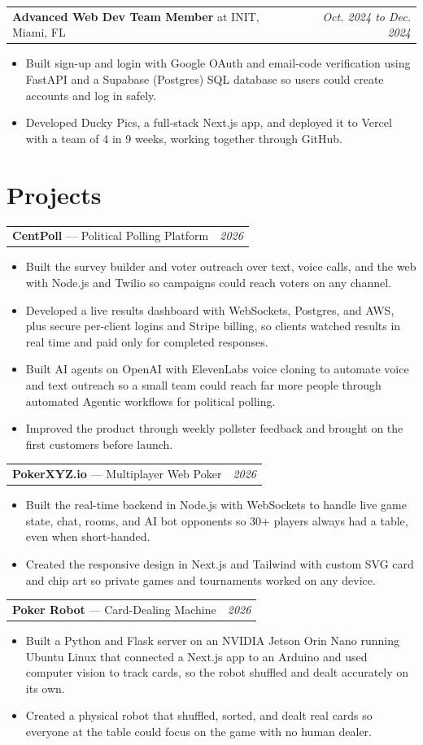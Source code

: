 \documentclass[letterpaper]{article}
\makeatletter
\newcommand{\entry}[3]{%
  \vspace{4pt}\needspace{4\baselineskip}
  \begin{tabular*}{\textwidth}{@{}l@{\extracolsep{\fill}}r@{}}
    \textbf{#1}#2 & \textit{#3} \\
  \end{tabular*}\par\vspace{1pt}}
\makeatother
\begin{document}
\entry{Advanced Web Dev Team Member}{ at INIT, Miami, FL}{Oct. 2024 to Dec. 2024}
\begin{itemize}
  \item Built sign-up and login with Google OAuth and email-code verification using FastAPI and a Supabase (Postgres) SQL database so users could create accounts and log in safely.
  \item Developed Ducky Pics, a full-stack Next.js app, and deployed it to Vercel with a team of 4 in 9 weeks, working together through GitHub.
\end{itemize}

\section{Projects}

\entry{CentPoll}{ --- Political Polling Platform}{2026}
\begin{itemize}
  \item Built the survey builder and voter outreach over text, voice calls, and the web with Node.js and Twilio so campaigns could reach voters on any channel.
  \item Developed a live results dashboard with WebSockets, Postgres, and AWS, plus secure per-client logins and Stripe billing, so clients watched results in real time and paid only for completed responses.
  \item Built AI agents on OpenAI with ElevenLabs voice cloning to automate voice and text outreach so a small team could reach far more people through automated Agentic workflows for political polling.
  \item Improved the product through weekly pollster feedback and brought on the first customers before launch.
\end{itemize}

\entry{PokerXYZ.io}{ --- Multiplayer Web Poker}{2026}
\begin{itemize}
  \item Built the real-time backend in Node.js with WebSockets to handle live game state, chat, rooms, and AI bot opponents so 30+ players always had a table, even when short-handed.
  \item Created the responsive design in Next.js and Tailwind with custom SVG card and chip art so private games and tournaments worked on any device.
\end{itemize}

\entry{Poker Robot}{ --- Card-Dealing Machine}{2026}
\begin{itemize}
  \item Built a Python and Flask server on an NVIDIA Jetson Orin Nano running Ubuntu Linux that connected a Next.js app to an Arduino and used computer vision to track cards, so the robot shuffled and dealt accurately on its own.
  \item Created a physical robot that shuffled, sorted, and dealt real cards so everyone at the table could focus on the game with no human dealer.
\end{itemize}
\end{document}
